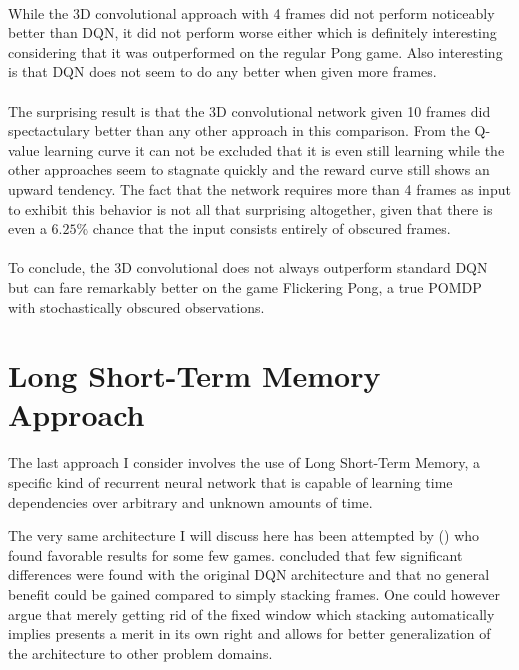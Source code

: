 \paragraph{}
While the 3D convolutional approach with 4 frames did not perform noticeably
better than DQN,
it did not perform worse either
which is definitely interesting considering
that it was outperformed on the regular Pong game.
Also interesting is that DQN does not seem to do any better when given more frames.

\paragraph{}
The surprising result is that the 3D convolutional network given 10 frames
did spectactulary better than any other approach in this comparison.
From the Q-value learning curve it can not be excluded that it is
even still learning while the other approaches seem to stagnate quickly
and the reward curve still shows an upward tendency.
The fact that the network requires more than 4 frames as input
to exhibit this behavior is not all that surprising altogether,
given that there is even a $6.25\%$ chance
that the input consists entirely of obscured frames.

\paragraph{}
To conclude,
the 3D convolutional does not always outperform standard DQN
but can fare remarkably better
on the game Flickering Pong,
a true POMDP with stochastically obscured observations.

\section{Long Short-Term Memory Approach}
\label{sec:long_short_term_memory_approach}
The last approach I consider involves
the use of Long Short-Term Memory,
a specific kind of recurrent neural network
that is capable of learning time dependencies
over arbitrary and unknown amounts of time.

The very same architecture I will discuss here
has been attempted by
\citeauthor{Hausknecht2015} (\citeyear{Hausknecht2015})
who found favorable results for some few games.
\citeauthor{Hausknecht2015}
concluded that few significant differences
were found with the original DQN architecture
and that no general benefit could be gained compared
to simply stacking frames.
One could however argue
that merely getting rid of the fixed window
which stacking automatically implies
presents a merit in its own right
and allows for better generalization of the architecture
to other problem domains.

